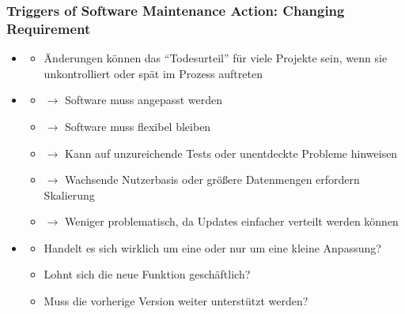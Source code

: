\subsubsection*{Triggers of Software Maintenance Action: Changing Requirement}
\begin{infoBox}[title=Änderungen während der Entwicklung und nach der Bereitstellung]
    \begin{itemize}
        \item {}
        \begin{itemize}
            \item Änderungen können das \enquote{Todesurteil} für viele Projekte sein, wenn sie unkontrolliert oder spät im Prozess auftreten
        \end{itemize}
        \item {}
        \begin{itemize}
            \item {} $\rightarrow$ Software muss angepasst werden
            \item {} $\rightarrow$ Software muss flexibel bleiben
            \item {} $\rightarrow$ Kann auf unzureichende Tests oder unentdeckte Probleme hinweisen
            \item {} $\rightarrow$ Wachsende Nutzerbasis oder größere Datenmengen erfordern Skalierung
            \item {} $\rightarrow$ Weniger problematisch, da Updates einfacher verteilt werden können
        \end{itemize}
        \item {}
        \begin{itemize}
            \item Handelt es sich wirklich um eine  oder nur um eine kleine Anpassung?
            \item Lohnt sich die neue Funktion geschäftlich?
            \item Muss die vorherige Version weiter unterstützt werden?
        \end{itemize}
    \end{itemize}
\end{infoBox}
